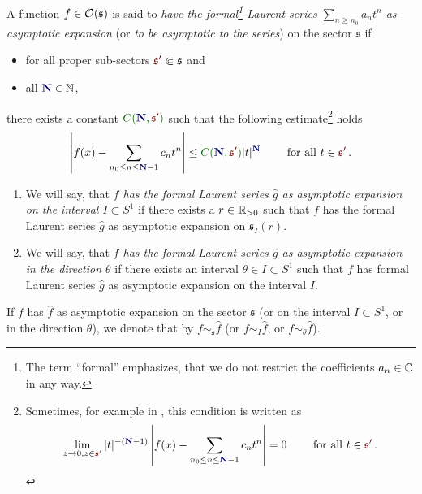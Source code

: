 \begin{defn}
  \def\myN{\textbf{\textcolor{blue!40!black}{N}}}
  \def\mySect{\textcolor{red!40!black}{\mathfrak{s}'}}
  \def\myConst{\textcolor{green!40!black}{C(\myN,\mySect)}}
  A function $f\in\mathcal{O}(\mathfrak{s})$ is said to \emph{have the
  formal\footnote{The term ``formal'' emphasizes, that we do not restrict the
  coefficients $a_n\in\mathbb{C}$ in any way.} Laurent series $\sum_{n\geq n_0}a_nt^n$
  as asymptotic expansion} (or \emph{to be asymptotic to the series}) on the
  sector $\mathfrak{s}$  if
  \begin{itemize}
    \item for all proper sub-sectors $\mySect\Subset\mathfrak{s}$ and
    \item all $\myN\in\N$,
  \end{itemize}
  there exists a constant
  $\myConst$ such that the following estimate\footnote{Sometimes, for example
    in \cite{sabbah_cimpa90}, this condition is written as
    \[
      \lim_{z\to0,z\in{\mySect}}
      |t|^{-(\myN-1)}
      \left|
        f(x)-\sum_{n_0\leq n\leq \myN-1}c_nt^n
      \right|=0
      \qquad \text{ for all } t\in \mySect \,.
    \]} holds
  \[
    \left|
      f(x)-\sum_{n_0\leq n\leq \myN-1}c_nt^n
    \right|
    \leq \myConst|t|^{\myN} \qquad \text{ for all }t\in \mySect \,.
  \]
  \begin{enumerate}
    \item We will say, that \emph{$f$ has the formal Laurent series $\hat g$ as
      asymptotic expansion on the interval $I\subset S^1$} if there exists a
      $r\in\mathbb{R}_{>0}$ such that $f$ has the formal Laurent series $\hat g$ as
      asymptotic expansion on $\mathfrak{s}_I(r)$.
    \item We will say, that \emph{$f$ has the formal Laurent series $\hat g$ as
      asymptotic expansion in the direction $\theta$} if there exists an
      interval $\theta\in I\subset S^1$ such that $f$ has formal Laurent series
      $\hat g$ as asymptotic expansion on the interval $I$.
  \end{enumerate}
\end{defn}
If $f$ has $\hat f$ as asymptotic expansion on the sector $\mathfrak{s}$ (or on
the interval $I\subset S^1$, or in the direction $\theta$), we denote that by
$f\sim_{\mathfrak{s}}\hat f$ (or $f\sim_{I}\hat f$, or $f\sim_{\theta}\hat f$).
